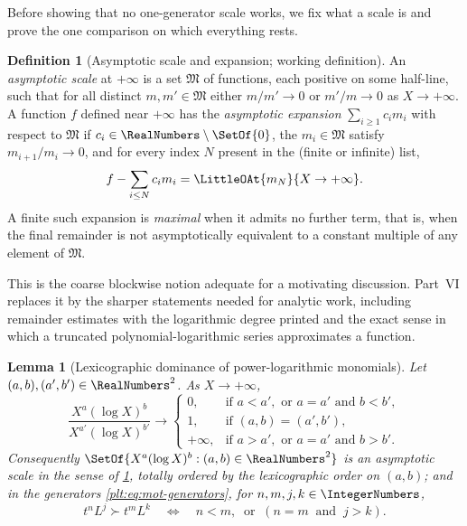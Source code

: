 \documentclass[11pt,oneside]{article}
\theoremstyle{plain}
\newtheorem{lemma}[theorem]{Lemma}
\theoremstyle{definition}
\newtheorem{definition}[theorem]{Definition}
\theoremstyle{remark}
\newcommand{\succdom}{\succ}
\begin{document}
Before showing that no one-generator scale works, we fix what a scale is and
prove the one comparison on which everything rests.

\begin{definition}[Asymptotic scale and expansion; working definition]
\label{plt:def:mot-scale}
An \emph{asymptotic scale} at \(+\infty\) is a set \(\mathfrak{M}\) of
functions, each positive on some half-line, such that for all distinct
\(m,m'\in\mathfrak{M}\) either \(m/m'\to0\) or \(m'/m\to0\) as
\(X\to+\infty\).  A function \(f\) defined near \(+\infty\) has the
\emph{asymptotic expansion} \(\sum_{i\ge1}c_{i}m_{i}\) with respect to
\(\mathfrak{M}\) if \(c_{i}\in\RealNumbers\setminus\SetOf{0}\), the
\(m_{i}\in\mathfrak{M}\) satisfy \(m_{i+1}/m_{i}\to0\), and for every index
\(N\) present in the (finite or infinite) list,
\[
  f-\sum_{i\le N}c_{i}m_{i}=\LittleOAt{m_{N}}{X\to+\infty}.
\]
A finite such expansion is \emph{maximal} when it admits no further term, that
is, when the final remainder is not asymptotically equivalent to a constant
multiple of any element of \(\mathfrak{M}\).
\end{definition}

This is the coarse blockwise notion adequate for a motivating discussion.
Part~VI replaces it by the sharper statements needed for analytic work,
including remainder estimates with the logarithmic degree printed and the exact
sense in which a truncated polynomial-logarithmic series approximates a
function.

\begin{lemma}[Lexicographic dominance of power-logarithmic monomials]
\label{plt:lem:mot-dominance}
Let \((a,b),(a',b')\in\RealNumbers^{2}\).  As \(X\to+\infty\),
\[
  \frac{X^{a}(\log X)^{b}}{X^{a'}(\log X)^{b'}}
  \longrightarrow
  \begin{cases}
    0,&\text{if }a<a',\text{ or }a=a'\text{ and }b<b',\\
    1,&\text{if }(a,b)=(a',b'),\\
    +\infty,&\text{if }a>a',\text{ or }a=a'\text{ and }b>b'.
  \end{cases}
\]
Consequently \(\SetOf{X^{a}(\log X)^{b}:(a,b)\in\RealNumbers^{2}}\) is an
asymptotic scale in the sense of \cref{plt:def:mot-scale}, totally ordered by
the lexicographic order on \((a,b)\); and in the generators
\eqref{plt:eq:mot-generators}, for \(n,m,j,k\in\IntegerNumbers\),
\begin{equation}\label{plt:eq:mot-dominance}
  t^{n}L^{j}\succdom t^{m}L^{k}
  \quad\Longleftrightarrow\quad
  n<m,\ \text{ or }\ (n=m\ \text{ and }\ j>k).
\end{equation}
\end{lemma}
\end{document}
